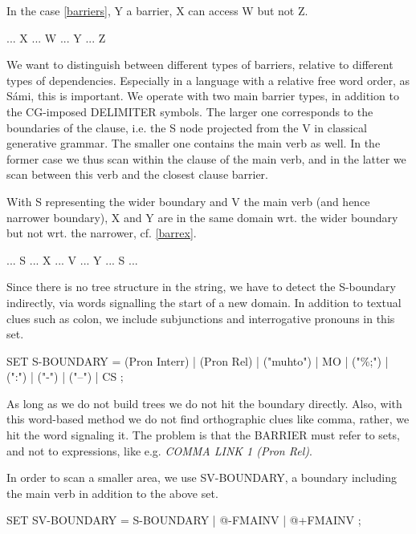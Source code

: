  \documentclass[a4paper,english]{article}
\begin{document}
In the case \ref{barriers}, Y a barrier, X can access W but not Z.%

\begin{example}\label{barriers}
... X ... W ... Y ... Z 
\end{example}

We want to distinguish between different types of barriers, relative to different types of dependencies. Especially in a language with a relative free word order, as Sámi, this is important. We operate with two main barrier types, in addition to the CG-imposed DELIMITER symbols. The larger one corresponds to the boundaries of the clause, i.e. the S node projected from the V in classical generative grammar. The smaller one contains the main verb as well. In the former case we thus scan within the clause of the main verb, and in the latter we scan between this verb and the closest clause barrier.%

With S representing the wider boundary and V the main verb (and hence narrower boundary), X and Y are in the same domain wrt. the wider boundary but not wrt. the narrower, cf. \ref{barrex}.%

\begin{example}\label{barrex}
... S ... X ... V ... Y ... S ... 
\end{example}

Since there is no tree structure in the string, we have to detect the S-boundary indirectly, via words signalling the start of a new domain. In addition to textual clues such as colon, we include subjunctions and interrogative pronouns in this set.%

\begin{example}\label{s}
SET S-BOUNDARY  = (Pron Interr) | (Pron Rel) | ("muhto") | MO | ("\%;") | (":") | ("-") | ("–") | CS ;	
\end{example}

As long as we do not build trees we do not hit the boundary directly. Also, with this word-based method we do not find orthographic clues like comma, rather, we hit the word signaling it. The problem is that the BARRIER must refer to sets, and not to expressions, like e.g. \textit{COMMA LINK 1 (Pron Rel)}.

In order to scan a smaller area, we use SV-BOUNDARY, a boundary including the main verb in addition to the above set.%

\begin{example}\label{sv}
SET SV-BOUNDARY = S-BOUNDARY | @-FMAINV | @+FMAINV ;
\end{example}
\end{document}
